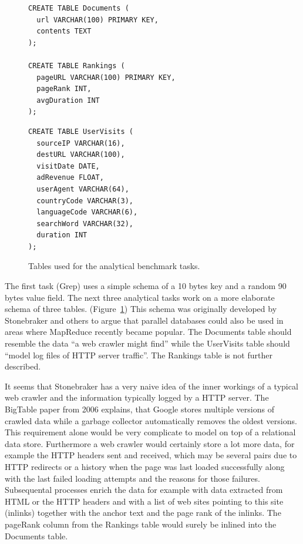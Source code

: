 \documentclass[12pt,a4paper]{scrartcl}		%
\begin{document}
\begin{figure}
  \centering
  \begin{multicols}{2}
\begin{verbatim}
CREATE TABLE Documents (
  url VARCHAR(100) PRIMARY KEY,
  contents TEXT 
);

CREATE TABLE Rankings (
  pageURL VARCHAR(100) PRIMARY KEY,
  pageRank INT,
  avgDuration INT 
);
\end{verbatim}    

\begin{verbatim}
CREATE TABLE UserVisits (
  sourceIP VARCHAR(16),
  destURL VARCHAR(100),
  visitDate DATE,
  adRevenue FLOAT,
  userAgent VARCHAR(64),
  countryCode VARCHAR(3),
  languageCode VARCHAR(6),
  searchWord VARCHAR(32),
  duration INT 
);
\end{verbatim}
  \end{multicols}
  \caption{Tables used for the analytical benchmark tasks.}
  \label{fig:tableschemas}
\end{figure}

The first task (Grep) uses a simple schema of a 10 bytes key and a random 90 bytes value field. The next three analytical tasks work on a more elaborate schema of three tables. (Figure~\ref{fig:tableschemas}) This schema was originally developed by Stonebraker and others to argue that parallel databases could also be used in areas where MapReduce recently became popular.\cite[1.]{Pavlo09} The Documents table should resemble the data ``a web crawler might find'' while the UserVisits table should ``model log files of HTTP server traffic''. The Rankings table is not further described.\cite[4.3]{Pavlo09}

It seems that Stonebraker has a very naive idea of the inner workings of a typical web crawler and the information typically logged by a HTTP server. The BigTable paper from 2006 explains, that Google stores multiple versions of crawled data while a garbage collector automatically removes the oldest versions.\cite{Chang:2006:BDS:1267308.1267323} This requirement alone would be very complicate to model on top of a relational data store. Furthermore a web crawler would certainly store a lot more data, for example the HTTP headers sent and received, which may be several pairs due to HTTP redirects or a history when the page was last loaded successfully along with the last failed loading attempts and the reasons for those failures. Subsequental processes enrich the data for example with data extracted from HTML or the HTTP headers and with a list of web sites pointing to this site (inlinks) together with the anchor text and the page rank of the inlinks. The pageRank column from the Rankings table would surely be inlined into the Documents table.
\end{document}

